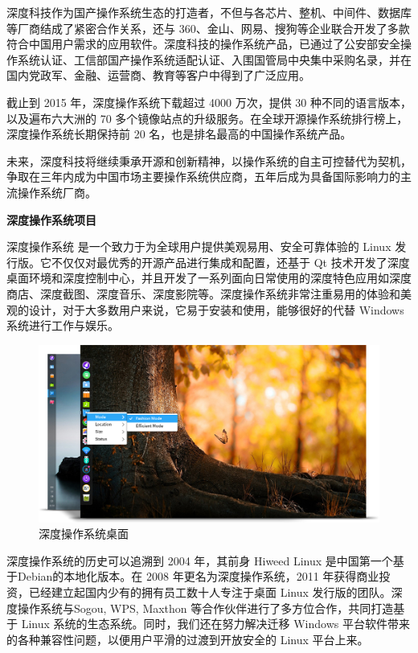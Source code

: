 \documentclass[doctor,openright,twoside]{sjtuthesis}
\theoremstyle{plain}
\theoremstyle{definition}
\theoremstyle{remark}
\theoremstyle{ocrenumbox}
\theoremstyle{plain}
\begin{document}
深度科技作为国产操作系统生态的打造者，不但与各芯片、整机、中间件、数据库等厂商结成了紧密合作关系，还与
360、金山、网易、搜狗等企业联合开发了多款符合中国用户需求的应用软件。深度科技的操作系统产品，已通过了公安部安全操作系统认证、工信部国产操作系统适配认证、入围国管局中央集中采购名录，并在国内党政军、金融、运营商、教育等客户中得到了广泛应用。

截止到 2015 年，深度操作系统下载超过 4000 万次，提供 30
种不同的语言版本，以及遍布六大洲的 70
多个镜像站点的升级服务。在全球开源操作系统排行榜上，深度操作系统长期保持前
20 名，也是排名最高的中国操作系统产品。

未来，深度科技将继续秉承开源和创新精神，以操作系统的自主可控替代为契机，争取在三年内成为中国市场主要操作系统供应商，五年后成为具备国际影响力的主流操作系统厂商。

\textbf{深度操作系统项目}

深度操作系统 是一个致力于为全球用户提供美观易用、安全可靠体验的 Linux
发行版。它不仅仅对最优秀的开源产品进行集成和配置，还基于 Qt
技术开发了深度桌面环境和深度控制中心，并且开发了一系列面向日常使用的深度特色应用如深度商店、深度截图、深度音乐、深度影院等。深度操作系统非常注重易用的体验和美观的设计，对于大多数用户来说，它易于安装和使用，能够很好的代替
Windows 系统进行工作与娱乐。

\begin{figure}
\includegraphics{en_about-us_content_sys} \caption[深度操作系统桌面]{深度操作系统桌面}\label{fig:deepin-os}
\end{figure}

深度操作系统的历史可以追溯到 2004 年，其前身 Hiweed Linux
是中国第一个基于Debian的本地化版本。在 2008 年更名为深度操作系统，2011
年获得商业投资，已经建立起国内少有的拥有员工数十人专注于桌面 Linux
发行版的团队。深度操作系统与Sogou, WPS, Maxthon
等合作伙伴进行了多方位合作，共同打造基于 Linux
系统的生态系统。同时，我们还在努力解决迁移 Windows
平台软件带来的各种兼容性问题，以便用户平滑的过渡到开放安全的 Linux
平台上来。
\end{document}
